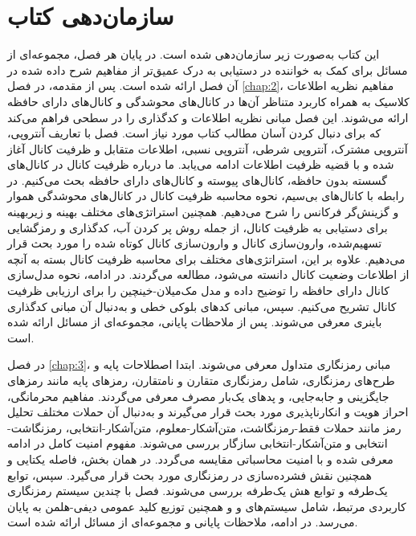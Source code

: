 \section{سازمان‌دهی کتاب}
\label{sec:1-3}
این کتاب به‌صورت زیر سازمان‌دهی شده است. در پایان هر فصل، مجموعه‌ای از مسائل برای کمک به خواننده در دستیابی به درک عمیق‌تر از مفاهیم شرح داده شده در آن فصل ارائه شده است. پس از مقدمه، در فصل \ref{chap:2}، مفاهیم نظریه اطلاعات کلاسیک به همراه کاربرد متناظر آن‌ها در کانال‌های محوشدگی و کانال‌های دارای حافظه ارائه می‌شوند. این فصل مبانی نظریه اطلاعات و کدگذاری را در سطحی فراهم می‌کند که برای دنبال کردن آسان مطالب کتاب مورد نیاز است. فصل با تعاریف آنتروپی، آنتروپی مشترک، آنتروپی شرطی، آنتروپی نسبی، اطلاعات متقابل و ظرفیت کانال آغاز شده و با قضیه ظرفیت اطلاعات ادامه می‌یابد. ما درباره ظرفیت کانال در کانال‌های گسسته بدون حافظه، کانال‌های پیوسته و کانال‌های دارای حافظه بحث می‌کنیم. در رابطه با کانال‌های بی‌سیم، نحوه محاسبه ظرفیت کانال در کانال‌های محوشدگی هموار و گزینش‌گر فرکانس را شرح می‌دهیم. همچنین استراتژی‌های مختلف بهینه و زیربهینه برای دستیابی به ظرفیت کانال، از جمله روش پر کردن آب، کدگذاری و رمزگشایی تسهیم‌شده، وارون‌سازی کانال و وارون‌سازی کانال کوتاه شده را مورد بحث قرار می‌دهیم. علاوه بر این، استراتژی‌های مختلف برای محاسبه ظرفیت کانال بسته به آنچه از اطلاعات وضعیت کانال دانسته می‌شود، مطالعه می‌گردند. در ادامه، نحوه مدل‌سازی کانال دارای حافظه را توضیح داده و مدل مک‌میلان-خینچین را برای ارزیابی ظرفیت کانال تشریح می‌کنیم. سپس، مبانی کدهای بلوکی خطی و به‌دنبال آن مبانی کدگذاری  باینری معرفی می‌شوند. پس از ملاحظات پایانی، مجموعه‌ای از مسائل ارائه شده است.

در فصل \ref{chap:3}، مبانی رمزنگاری متداول معرفی می‌شوند. ابتدا اصطلاحات پایه و طرح‌های رمزنگاری، شامل رمزنگاری متقارن و نامتقارن، رمزهای پایه مانند رمزهای جایگزینی و جابه‌جایی، و پد‌های یک‌بار مصرف معرفی می‌گردند. مفاهیم محرمانگی، احراز هویت و انکارناپذیری مورد بحث قرار می‌گیرند و به‌دنبال آن حملات مختلف تحلیل رمز مانند حملات فقط-رمزنگاشت، متن‌آشکار-معلوم، متن‌آشکار-انتخابی، رمزنگاشت-انتخابی و متن‌آشکار-انتخابی سازگار بررسی می‌شوند. مفهوم امنیت کامل در ادامه معرفی شده و با امنیت محاسباتی مقایسه می‌گردد. در همان بخش، فاصله یکتایی و همچنین نقش فشرده‌سازی در رمزنگاری مورد بحث قرار می‌گیرد. سپس، توابع یک‌طرفه و توابع هش یک‌طرفه بررسی می‌شوند. فصل با چندین سیستم رمزنگاری کاربردی مرتبط، شامل سیستم‌های  و  و همچنین توزیع کلید عمومی دیفی-هلمن به پایان می‌رسد. در ادامه، ملاحظات پایانی و مجموعه‌ای از مسائل ارائه شده است.

